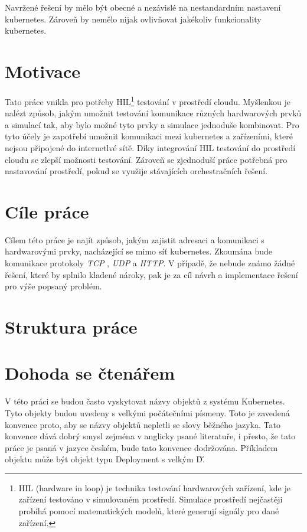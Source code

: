 Navržené řešení by mělo být obecné a nezávislé na nestandardním nastavení kubernetes. Zároveň by nemělo nijak ovlivňovat jakékoliv funkcionality kubernetes. 

\newpage

\section{Motivace}
Tato práce vnikla pro potřeby HIL\footnote{HIL (hardware in loop) je technika testování hardwarových zařízení, kde je zařízení testováno v simulovaném prostředí. Simulace prostředí nejčastěji probíhá pomocí matematických modelů, které generují signály pro dané zařízení.} testování v prostředí cloudu. Myšlenkou je nalézt způsob, jakým umožnit testování komunikace různých hardwarových prvků a simulací tak, aby bylo možné tyto prvky a simulace jednoduše kombinovat. Pro tyto účely je zapotřebí umožnit komunikaci mezi kubernetes a zařízeními, které nejsou připojené do internetlvé sítě. Díky integrování HIL testování do prostředí cloudu se zlepší možnosti testování. Zároveň se zjednoduší práce potřebná pro nastavování prostředí, pokud se využije stávajících orchestračních řešení.

\section{Cíle práce}
Cílem této práce je najít způsob, jakým zajistit adresaci a komunikaci s hardwarovými prvky, nacházející se mimo síť kubernetes. Zkoumána bude komunikace protokoly \textit{TCP} , \textit{UDP} a \textit{HTTP}. V případě, že nebude známo žádné řešení, které by splnilo kladené nároky, pak je za cíl návrh a implementace řešení pro výše popsaný problém.

\section{Struktura práce}
\section{Dohoda se čtenářem}
V této práci se budou často vyskytovat názvy objektů z systému Kubernetes. Tyto objekty budou uvedeny s velkými počátečními písmeny. Toto je zavedená konvence proto, aby se názvy objektů nepletli se slovy běžného jazyka. Tato konvence dává dobrý smysl zejména v anglicky psané literatuře, i přesto, že tato práce je psaná v jazyce českém, bude tato konvence dodržována. Příkladem objektu může být objekt typu Deployment s velkým \'D\'.

